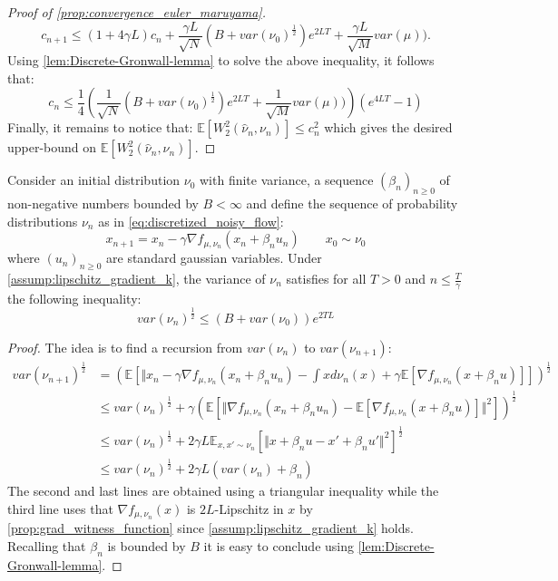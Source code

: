 \begin{proof}[Proof of \cref{prop:convergence_euler_maruyama}]
\[
c_{n+1}\leq(1+4\gamma L)c_{n}+\frac{\gamma L}{\sqrt{N}}(B+var(\nu_{0})^{\frac{1}{2}})e^{2LT}+\frac{\gamma L}{\sqrt{M}}var(\mu)).
\]
Using \cref{lem:Discrete-Gronwall-lemma} to solve the above inequality, it follows that:
\[
c_{n}\leq\frac{1}{4}\left(\frac{1}{\sqrt{N}}(B+var(\nu_{0})^{\frac{1}{2}})e^{2LT}+\frac{1}{\sqrt{M}}var(\mu))\right)(e^{4LT}-1)
\]
Finally, it remains to notice that: $\mathbb{E}[W_{2}^{2}(\hat{\nu}_{n},\nu_{n})]\leq c_{n}^{2}$ which gives the desired upper-bound on $\mathbb{E}[W_{2}^{2}(\hat{\nu}_{n},\nu_{n})]$. 
\end{proof}



%
\begin{lemma}\label{lem:Control_variance}
Consider an initial distribution
$\nu_{0}$ with finite variance, a sequence $(\beta_n)_{ n \geq 0}$ of non-negative numbers bounded by $B<\infty$ and define the sequence of probability distributions $\nu_n$ as in \cref{eq:discretized_noisy_flow}:
\[
x_{n+1}=x_{n}-\gamma\nabla f_{\mu,\nu_{n}}(x_{n}+\beta_{n}u_{n}) \qquad x_0 \sim \nu_0
\]
where $(u_n)_{n\geq 0}$ are standard gaussian variables. 
Under \cref{assump:lipschitz_gradient_k},  the variance of
$\nu_{n}$ satisfies for all $T>0$ and $n\leq\frac{T}{\gamma}$ the following inequality:
\[
var(\nu_{n})^{\frac{1}{2}}\leq(B+var(\nu_{0}))e^{2TL}
\]
\end{lemma}
%
\begin{proof}
The idea is to find a recursion from $var(\nu_{n})$ to $var(\nu_{n+1})$:
\begin{align*}
var(\nu_{n+1})^{\frac{1}{2}} 
 & =(\mathbb{E}[\Vert x_{n}-\gamma\nabla f_{\mu,\nu_{n}}(x_{n}+\beta_{n}u_{n})-\int xd\nu_{n}(x)+\gamma\mathbb{E}[\nabla f_{\mu,\nu_{n}}(x+\beta_{n}u)]])^{\frac{1}{2}}\\
 & \leq var(\nu_{n})^{\frac{1}{2}}+\gamma(\mathbb{E}[\Vert\nabla f_{\mu,\nu_{n}}(x_{n}+\beta_{n}u_{n})-\mathbb{E}[\nabla f_{\mu,\nu_{n}}(x+\beta_{n}u)]\Vert^{2}])^{\frac{1}{2}}\\
 & \leq var(\nu_{n})^{\frac{1}{2}}+2\gamma L\mathbb{E}_{x,x'\sim\nu_{n}}[\Vert x+\beta_{n}u-x'+\beta_{n}u'\Vert^{2}]^{\frac{1}{2}}\\
 & \leq var(\nu_{n})^{\frac{1}{2}}+2\gamma L(var(\nu_{n})+\beta_{n})
\end{align*}
The second and last lines are obtained using a triangular inequality while the third line uses that $\nabla f_{\mu,\nu_n}(x)$ is $2L$-Lipschitz in $x$ by  \cref{prop:grad_witness_function} since \cref{assump:lipschitz_gradient_k} holds. Recalling that $\beta_{n}$ is bounded by $B$ it is easy to conclude using \cref{lem:Discrete-Gronwall-lemma}. 
\end{proof}


